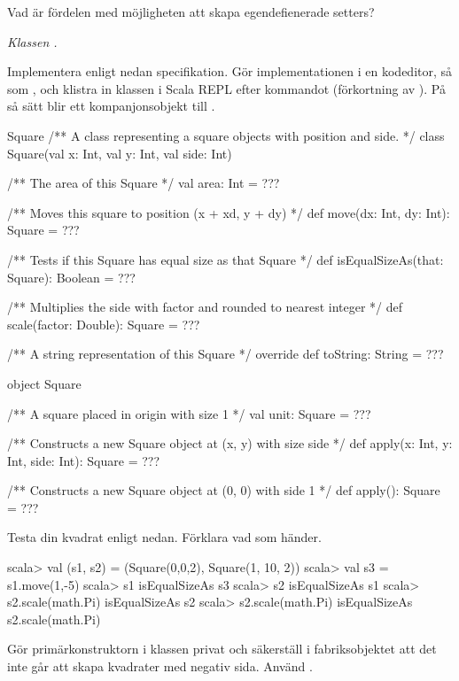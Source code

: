 \Subtask\Pen Vad är fördelen med möjligheten att skapa egendefienerade setters?

\Task \label{task:Square} \emph{Klassen .} 

\Subtask Implementera  enligt nedan specifikation. Gör  implementationen i en kodeditor, så som , och klistra in klassen i Scala REPL efter kommandot  (förkortning av ). På så sätt blir  ett kompanjonsobjekt till .

\begin{ScalaSpec}{Square}
/** A class representing a square objects with position and side. */
class Square(val x: Int, val y: Int, val side: Int) {
  /** The area of this Square */
  val area: Int = ???
  
  /** Moves this square to position (x + xd, y + dy) */
  def move(dx: Int, dy: Int): Square = ???
  
  /** Tests if this Square has equal size as that Square */
  def isEqualSizeAs(that: Square): Boolean = ???
  
  /** Multiplies the side with factor and rounded to nearest integer */
  def scale(factor: Double): Square = ???
  
  /** A string representation of this Square */
  override def toString: String = ???
}

object Square {
  /** A square placed in origin with size 1 */
  val unit: Square = ??? 
  
  /** Constructs a new Square object at (x, y) with size side */
  def apply(x: Int, y: Int, side: Int): Square = ???

  /** Constructs a new Square object at (0, 0) with side 1 */
  def apply(): Square = ???
}
\end{ScalaSpec}

\Subtask Testa din kvadrat enligt nedan. Förklara vad som händer.

\begin{REPL}
scala> val (s1, s2) = (Square(0,0,2), Square(1, 10, 2))
scala> val s3 = s1.move(1,-5)
scala> s1 isEqualSizeAs s3
scala> s2 isEqualSizeAs s1
scala> s2.scale(math.Pi) isEqualSizeAs s2
scala> s2.scale(math.Pi) isEqualSizeAs s2.scale(math.Pi)
\end{REPL}

\Subtask Gör primärkonstruktorn i klassen  privat och säkerställ i fabriksobjektet att det inte går att skapa kvadrater med negativ sida. Använd .  

